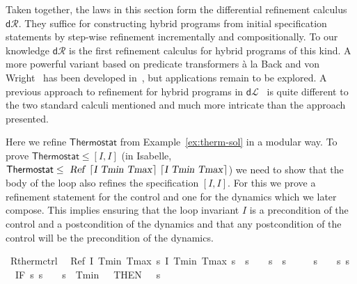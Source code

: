 \documentclass[envcountsame,envcountsect]{llncs}
\newcommand{\dL}{\mathsf{d}\mathcal{L}}
\newcommand{\dR}{\mathsf{d}\mathcal{R}}
\begin{document}
Taken together, the laws in this section form the differential
refinement calculus $\dR$.  They suffice for constructing hybrid
programs from initial specification statements by step-wise refinement
incrementally and compositionally. To our knowledge $\dR$ is the first
refinement calculus for hybrid programs of this kind.  A more powerful
variant based on predicate transformers \`a la Back and von
Wright~\cite{BackW98} has been developed in~\cite{MuniveS19}, but
applications remain to be explored.  A previous approach to refinement
for hybrid programs in $\dL$~\cite{LoosP16} is quite different to the
two standard calculi mentioned and much more intricate than the
approach presented.

\begin{example}\label{ex:therm-rsol}
Here we refine $\mathsf{Thermostat}$ from Example~\ref{ex:therm-sol} in a modular way. To prove $\mathsf{Thermostat}\leq [I,I]$ (in Isabelle, $\mathsf{Thermostat}\leq \isa{Ref\ {\isasymlceil}I\ Tmin\ Tmax{\isasymrceil}\ {\isasymlceil}I\ Tmin\ Tmax{\isasymrceil}}$) we need to show that the body of the loop also refines the specification $[I,I]$. For this we prove a refinement statement for the control and one for the dynamics which we later compose. This implies ensuring that the loop invariant $I$ is a precondition of the control and a postcondition of the dynamics and that any postcondition of the control will be the precondition of the dynamics.
\begin{isabellebody}
\isanewline
{}\isamarkupfalse%
\ R{\isacharunderscore}therm{\isacharunderscore}ctrl{\isacharcolon}\isanewline
\ \ {\isachardoublequoteopen}Ref\ {\isasymlceil}I\ Tmin\ Tmax{\isasymrceil}\ {\isasymlceil}{\isasymlambda}s{\isachardot}\ I\ Tmin\ Tmax\ s\ {\isasymand}\ s{\isachardollar}{}\ {\isacharequal}\ {}\ {\isasymand}\ s{\isachardollar}{}\ {\isacharequal}\ s{\isachardollar}{}{\isasymrceil}\ {\isasymge}\isanewline
\ \ {\isacharparenleft}{}\ {\isacharcolon}{\isacharcolon}{\isacharequal}\ {\isacharparenleft}{\isasymlambda}s{\isachardot}\ {}{\isacharparenright}{\isacharparenright}{\isacharsemicolon}\ {\isacharparenleft}{}\ {\isacharcolon}{\isacharcolon}{\isacharequal}\ {\isacharparenleft}{\isasymlambda}s{\isachardot}\ s{\isachardollar}{}{\isacharparenright}{\isacharparenright}{\isacharsemicolon}\isanewline
\ \ {\isacharparenleft}IF\ {\isacharparenleft}{\isasymlambda}s{\isachardot}\ s{\isachardollar}{}\ {\isacharequal}\ {}\ {\isasymand}\ s{\isachardollar}{}\ {\isasymle}\ Tmin\ {\isacharplus}\ {}{\isacharparenright}\ THEN\ {\isacharparenleft}{}\ {\isacharcolon}{\isacharcolon}{\isacharequal}\ {\isacharparenleft}{\isasymlambda}s{\isachardot}{}{\isacharparenright}{\isacharparenright}\ \isanewline

\end{isabellebody}
\end{example}
\end{document}
